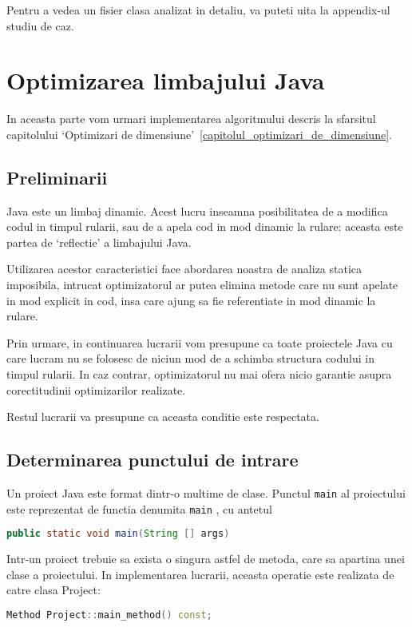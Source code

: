 Pentru a vedea un fisier clasa analizat in detaliu, va puteti
uita la appendix-ul studiu de caz.


\section{Optimizarea limbajului Java}

In aceasta parte vom urmari implementarea algoritmului descris la sfarsitul
capitolului `Optimizari de dimensiune'~\ref{capitolul_optimizari_de_dimensiune}.

\subsection{Preliminarii}

Java este un limbaj dinamic. Acest lucru inseamna posibilitatea de a modifica
codul in timpul rularii, sau de a apela cod in mod dinamic la rulare: aceasta
este partea de `reflectie' a limbajului Java.

Utilizarea acestor caracteristici face abordarea noastra de analiza
statica imposibila, intrucat optimizatorul ar putea elimina metode care nu sunt
apelate in mod explicit in cod, insa care ajung sa fie referentiate in mod
dinamic la rulare.

Prin urmare, in continuarea lucrarii vom presupune ca toate proiectele Java cu
care lucram nu se folosesc de niciun mod de a schimba structura codului in
timpul rularii. In caz contrar, optimizatorul nu mai ofera nicio garantie asupra
corectitudinii optimizarilor realizate.

Restul lucrarii va presupune ca aceasta conditie este respectata.

\subsection{Determinarea punctului de intrare}

Un proiect Java este format dintr-o multime de clase.
Punctul \texttt{main} al proiectului este reprezentat de functia
denumita \texttt{main} \cite{java_main}, cu antetul

\begin{lstlisting}[language=Java]
public static void main(String [] args)
\end{lstlisting}

Intr-un proiect trebuie sa exista o singura astfel de metoda, care sa apartina
unei clase a proiectului.
In implementarea lucrarii, aceasta operatie este realizata de
catre clasa Project:
\begin{lstlisting}[language=C++]
Method Project::main_method() const;
\end{lstlisting}

